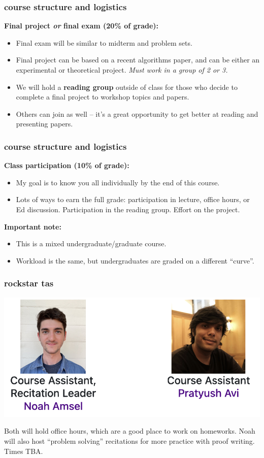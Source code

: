 \documentclass[]{beamer}
\begin{document}
	\begin{frame}
		\frametitle{course structure and logistics}
		\textbf{Final project \emph{or} final exam (20\% of grade):}
		\begin{itemize}
			\item Final exam will be similar to midterm and problem sets. 
			\item Final project can be based on a recent algorithms paper, and can be either an experimental or theoretical project. \emph{Must work in a group of 2 or 3.}
			\item We will hold a \textbf{reading group} outside of class for those who decide to complete a final project to workshop topics and papers. 
			\item Others can join as well -- it's a great opportunity to get better at reading and presenting papers.
		\end{itemize}
	\end{frame}
	
	\begin{frame}
		\frametitle{course structure and logistics}
		\textbf{Class participation (10\% of grade):}
		\begin{itemize}
			\item My goal is to know you all individually by the end of this course.
			\item Lots of ways to earn the full grade: participation in lecture, office hours, or Ed discussion. Participation in the reading group. Effort on the project. 
		\end{itemize}
		\textbf{Important note:}
	\begin{itemize}
		\item This is a mixed undergraduate/graduate course. 
		\item Workload is the same, but undergraduates are graded on a different ``curve''.
	\end{itemize}
	\end{frame}
	
	\begin{frame}
		\frametitle{rockstar tas}
		\begin{center}
			\includegraphics[width=.7\textwidth]{course_team.png}
		\end{center}
	Both will hold office hours, which are a good place to work on homeworks. Noah will also host ``problem solving'' recitations for more practice with proof writing. Times TBA.
	\end{frame}
	
\end{document}
